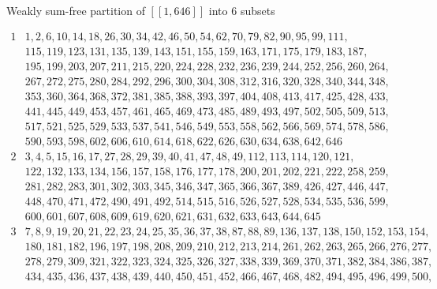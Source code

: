 \documentclass{article}
\newtheorem{computational theorem}[definition]{Computational Theorem}
\begin{document}
\begin{table}[H]
{\footnotesize
	\caption{Weakly sum-free partition of \([\![ 1, 646 ]\!] \) into 6 subsets}}
\begin{center}
\begin{small}
	\[
	\begin{array}{|*{2}{c|}}
		\hline
		1 & 1, 2, 6, 10, 14, 18, 26, 30, 34, 42, 46, 50, 54, 62, 70, 79, 82, 90, 95, 99, 111, \\
		& 115, 119, 123, 131, 135, 139, 143, 151, 155, 159, 163, 171, 175, 179, 183, 187, \\
		& 195, 199, 203, 207, 211, 215, 220, 224, 228, 232, 236, 239, 244, 252, 256, 260, 264, \\
		& 267, 272, 275, 280, 284, 292, 296, 300, 304, 308, 312, 316, 320, 328, 340, 344, 348, \\
		& 353, 360, 364, 368, 372, 381, 385, 388, 393, 397, 404, 408, 413, 417, 425, 428, 433, \\
		& 441, 445, 449, 453, 457, 461, 465, 469, 473, 485, 489, 493, 497, 502, 505, 509, 513, \\
		& 517, 521, 525, 529, 533, 537, 541, 546, 549, 553, 558, 562, 566, 569, 574, 578, 586, \\
		& 590, 593, 598, 602, 606, 610, 614, 618, 622, 626, 630, 634, 638, 642, 646 \\
		\hline
		2 & 3, 4, 5, 15, 16, 17, 27, 28, 29, 39, 40, 41, 47, 48, 49, 112, 113, 114, 120, 121, \\
		& 122, 132, 133, 134, 156, 157, 158, 176, 177, 178, 200, 201, 202, 221, 222, 258, 259, \\
		& 281, 282, 283, 301, 302, 303, 345, 346, 347, 365, 366, 367, 389, 426, 427, 446, 447, \\
		& 448, 470, 471, 472, 490, 491, 492, 514, 515, 516, 526, 527, 528, 534, 535, 536, 599, \\
		& 600, 601, 607, 608, 609, 619, 620, 621, 631, 632, 633, 643, 644, 645 \\
		\hline
		3 & 7, 8, 9, 19, 20, 21, 22, 23, 24, 25, 35, 36, 37, 38, 87, 88, 89, 136, 137, 138, 150, 152, 153, 154,\\
		& 180, 181, 182, 196, 197, 198, 208, 209, 210, 212, 213, 214, 261, 262, 263, 265, 266, 276, 277,\\
		& 278, 279, 309, 321, 322, 323, 324, 325, 326, 327, 338, 339, 369, 370, 371, 382, 384, 386, 387,\\
		& 434, 435, 436, 437, 438, 439, 440, 450, 451, 452, 466, 467, 468, 482, 494, 495, 496, 499, 500, \\

\end{array}\]
\end{small}
\end{center}
\end{table}
\end{document}

